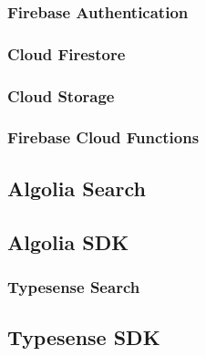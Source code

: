 \subsubsection{Firebase Authentication}


\subsubsection{Cloud Firestore}

\subsubsection{Cloud Storage}
\subsubsection{Firebase Cloud Functions}




\subsection{Algolia Search}
\subsection{Algolia SDK}

\subsubsection{Typesense Search}
\subsection{Typesense SDK}
